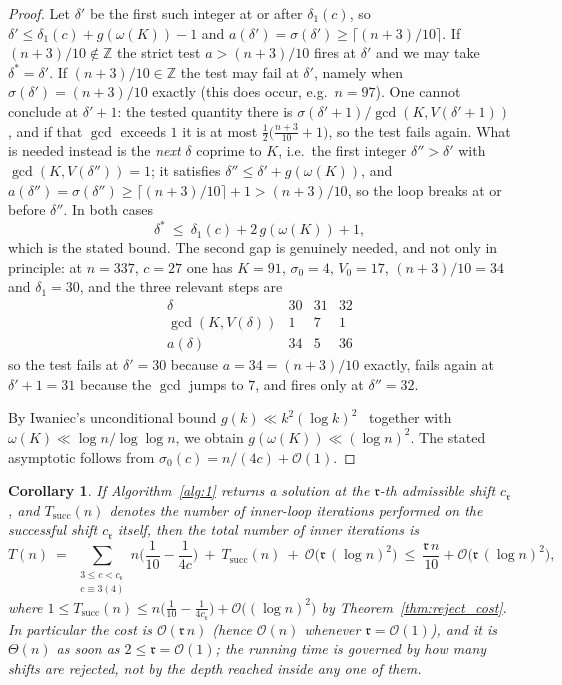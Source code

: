 \documentclass[11pt, a4paper]{article}
\theoremstyle{plain}
\newtheorem{corollary}[theorem]{Corollary}
\theoremstyle{definition}
\newcommand{\Z}{\mathbb{Z}}
\begin{document}
\begin{proof}
Let $\delta'$ be the first such integer at or after $\delta_1(c)$, so $\delta'\le\delta_1(c)+g(\omega(K))-1$ and $a(\delta')=\sigma(\delta')\ge\lceil(n+3)/10\rceil$. If $(n+3)/10\notin\Z$ the strict test $a>(n+3)/10$ fires at $\delta'$ and we may take $\delta^{*}=\delta'$. If $(n+3)/10\in\Z$ the test may fail at $\delta'$, namely when $\sigma(\delta')=(n+3)/10$ exactly (this does occur, e.g.\ $n=97$). One cannot conclude at $\delta'+1$: the tested quantity there is $\sigma(\delta'+1)/\gcd(K,V(\delta'+1))$, and if that $\gcd$ exceeds $1$ it is at most $\tfrac12\big(\tfrac{n+3}{10}+1\big)$, so the test fails again. What is needed instead is the \emph{next} $\delta$ coprime to $K$, i.e.\ the first integer $\delta''>\delta'$ with $\gcd(K,V(\delta''))=1$; it satisfies $\delta''\le\delta'+g(\omega(K))$, and $a(\delta'')=\sigma(\delta'')\ge\lceil(n+3)/10\rceil+1>(n+3)/10$, so the loop breaks at or before $\delta''$. In both cases
$$\delta^{*}\ \le\ \delta_1(c)+2\,g(\omega(K))+1 ,$$
which is the stated bound. The second gap is genuinely needed, and not only in principle: at $n=337$, $c=27$ one has $K=91$, $\sigma_0=4$, $V_0=17$, $(n+3)/10=34$ and $\delta_1=30$, and the three relevant steps are
$$\begin{array}{c|ccc}
\delta & 30 & 31 & 32\\\hline
\gcd(K,V(\delta)) & 1 & 7 & 1\\
a(\delta) & 34 & 5 & 36
\end{array}$$
so the test fails at $\delta'=30$ because $a=34=(n+3)/10$ exactly, fails again at $\delta'+1=31$ because the $\gcd$ jumps to $7$, and fires only at $\delta''=32$.

By Iwaniec's unconditional bound $g(k)\ll k^{2}(\log k)^{2}$~\cite{iwaniec1978} together with $\omega(K)\ll\log n/\log\log n$, we obtain $g(\omega(K))\ll(\log n)^{2}$. The stated asymptotic follows from $\sigma_0(c)=n/(4c)+\mathcal{O}(1)$.
\end{proof}

\begin{corollary}\label{cor:practical_time}
If Algorithm~\ref{alg:1} returns a solution at the $\mathfrak{r}$-th admissible shift $c_{\mathfrak{r}}$, and $T_{\mathrm{succ}}(n)$ denotes the number of inner-loop iterations performed on the successful shift $c_{\mathfrak{r}}$ itself, then the total number of inner iterations is
$$T(n)\ =\ \sum_{\substack{3\le c<c_{\mathfrak{r}}\\ c\equiv3(4)}} n\Big(\frac{1}{10}-\frac{1}{4c}\Big)\ +\ T_{\mathrm{succ}}(n)\ +\ \mathcal{O}\big(\mathfrak{r}\,(\log n)^{2}\big)\ \le\ \frac{\mathfrak{r}\,n}{10}+\mathcal{O}\big(\mathfrak{r}\,(\log n)^{2}\big),$$
where $1\le T_{\mathrm{succ}}(n)\le n\big(\frac{1}{10}-\frac{1}{4c_{\mathfrak{r}}}\big)+\mathcal{O}\big((\log n)^{2}\big)$ by Theorem~\ref{thm:reject_cost}. In particular the cost is $\mathcal{O}(\mathfrak{r}\,n)$ (hence $\mathcal{O}(n)$ whenever $\mathfrak{r}=\mathcal{O}(1)$), and it is $\Theta(n)$ as soon as $2\le\mathfrak{r}=\mathcal{O}(1)$; the running time is governed by \emph{how many shifts are rejected}, not by the depth reached inside any one of them.
\end{corollary}
\end{document}
